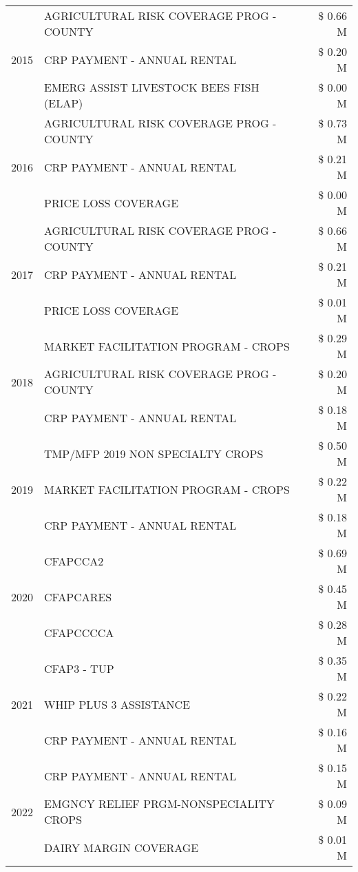 \begin{tabular}{llr}
\cline{1-3}
\multirow[t]{3}{*}{2015} & AGRICULTURAL RISK COVERAGE PROG - COUNTY & \$ 0.66 M \\
 & CRP PAYMENT - ANNUAL RENTAL & \$ 0.20 M \\
 & EMERG ASSIST LIVESTOCK BEES FISH (ELAP) & \$ 0.00 M \\
\cline{1-3}
\multirow[t]{3}{*}{2016} & AGRICULTURAL RISK COVERAGE PROG - COUNTY & \$ 0.73 M \\
 & CRP PAYMENT - ANNUAL RENTAL & \$ 0.21 M \\
 & PRICE LOSS COVERAGE & \$ 0.00 M \\
\cline{1-3}
\multirow[t]{3}{*}{2017} & AGRICULTURAL RISK COVERAGE PROG - COUNTY & \$ 0.66 M \\
 & CRP PAYMENT - ANNUAL RENTAL & \$ 0.21 M \\
 & PRICE LOSS COVERAGE & \$ 0.01 M \\
\cline{1-3}
\multirow[t]{3}{*}{2018} & MARKET FACILITATION PROGRAM - CROPS & \$ 0.29 M \\
 & AGRICULTURAL RISK COVERAGE PROG - COUNTY & \$ 0.20 M \\
 & CRP PAYMENT - ANNUAL RENTAL & \$ 0.18 M \\
\cline{1-3}
\multirow[t]{3}{*}{2019} & TMP/MFP 2019 NON SPECIALTY CROPS & \$ 0.50 M \\
 & MARKET FACILITATION PROGRAM - CROPS & \$ 0.22 M \\
 & CRP PAYMENT - ANNUAL RENTAL & \$ 0.18 M \\
\cline{1-3}
\multirow[t]{3}{*}{2020} & CFAPCCA2 & \$ 0.69 M \\
 & CFAPCARES & \$ 0.45 M \\
 & CFAPCCCCA & \$ 0.28 M \\
\cline{1-3}
\multirow[t]{3}{*}{2021} & CFAP3 - TUP & \$ 0.35 M \\
 & WHIP PLUS 3 ASSISTANCE & \$ 0.22 M \\
 & CRP PAYMENT - ANNUAL RENTAL & \$ 0.16 M \\
\cline{1-3}
\multirow[t]{3}{*}{2022} & CRP PAYMENT - ANNUAL RENTAL & \$ 0.15 M \\
 & EMGNCY RELIEF PRGM-NONSPECIALITY CROPS & \$ 0.09 M \\
 & DAIRY MARGIN COVERAGE & \$ 0.01 M \\
\cline{1-3}
\bottomrule
\end{tabular}
